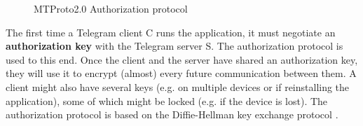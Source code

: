 \begin{figure}[!t]
\begin{msc}{}
        \nextlevel

        \nextlevel[3]



    \end{msc}
    \centering
    \caption{MTProto2.0 Authorization protocol}
    \label{fig:authorization-protocol}
\end{figure}


The first time a Telegram client C runs the application, it must negotiate an \textbf{authorization key} with the Telegram server S. The authorization protocol is used to this end. Once the client and the server have shared an authorization key, they will use it to encrypt (almost) every future communication between them. A client might also have several keys (e.g. on multiple devices or if reinstalling the application), some of which might be locked (e.g. if the device is lost). The authorization protocol is based on the Diffie-Hellman key exchange protocol \cite{DH-protocol}.


